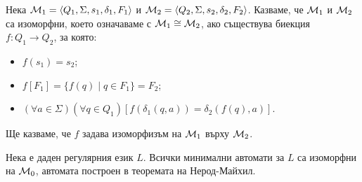 \begin{dfn}
  Нека $\mathcal{M}_1 = \langle{Q_1,\Sigma,s_1,\delta_1,F_1}\rangle$ и $\mathcal{M}_2 = \langle{Q_2,\Sigma,s_2,\delta_2,F_2}\rangle$.
  Казваме, че $\mathcal{M}_1$ и $\mathcal{M}_2$ са изоморфни, което означаваме с $\mathcal{M}_1 \cong \mathcal{M}_2$, ако
  съществува биекция $f: Q_1\to Q_2$, за която:
  \begin{itemize}
  \item
    $f(s_1) = s_2$;
  \item
    $f[F_1] = \{f(q)\mid q\in F_1\} = F_2$;
  \item
    $(\forall a\in\Sigma)(\forall q\in Q_1)[f(\delta_1(q,a)) = \delta_2(f(q),a)]$.
  \end{itemize}
  Ще казваме, че $f$ задава изоморфизъм на $\mathcal{M}_1$ върху $\mathcal{M}_2$.
\end{dfn}

\begin{cor}
  Нека е даден регулярния език $L$.
  Всички минимални автомати за $L$ са изоморфни на $\mathcal{M}_0$, автомата построен в теоремата на Нерод-Майхил.
\end{cor}
